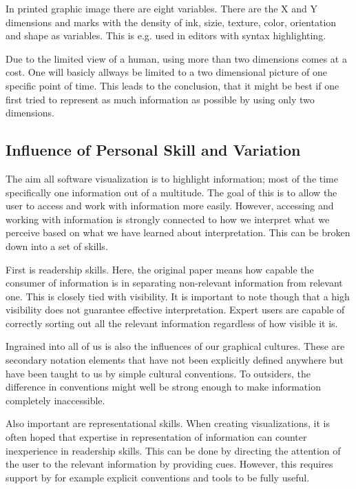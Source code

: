 \documentclass[11pt, a4paper, ngerman, twoside]{article}
\theoremstyle{plain}\newtheorem{Lemma}{Lemma}
\theoremstyle{plain}\newtheorem{Satz}[Lemma]{Satz}
\theoremstyle{definition}\newtheorem{Definition}[Lemma]{Definition}
\theoremstyle{definition}\newtheorem*{Beispiel}{Beispiel}
\theoremstyle{remark}\newtheorem*{Bemerkung}{Bemerkung}
\begin{document}
In printed graphic image there are eight variables\cite{bertin}. There are the X and Y dimensions and marks with the density of ink, sizie, texture, color, orientation and shape as variables. This is e.g. used in editors with syntax highlighting.

Due to the limited view of a human, using more than two dimensions comes at a cost. One will basicly allways be limited to a two dimensional picture of one specific point of time. This leads to the conclusion, that it might be best if one first tried to represent as much information as possible by using only two dimensions.

\subsection{Influence of Personal Skill and Variation}

The aim all software visualization is to highlight information; most of the time specifically one information out of a multitude. The goal of this is to allow the user to access and work with information more easily. However, accessing and working with information is strongly connected to how we interpret what we perceive based on what we have learned about interpretation. This can be broken down into a set of skills.

First is readership skills. Here, the original paper means how capable the consumer of information is in separating non-relevant information from relevant one. This is closely tied with visibility. It is important to note though that a high visibility does not guarantee effective interpretation. Expert users are capable of correctly sorting out all the relevant information regardless of how visible it is.

Ingrained into all of us is also the influences of our graphical cultures. These are secondary notation elements that have not been explicitly defined anywhere but have been taught to us by simple cultural conventions. To outsiders, the difference in conventions might well be strong enough to make information completely inaccessible.

Also important are representational skills. When creating visualizations, it is often hoped that expertise in representation of information can counter inexperience in readership skills. This can be done by directing the attention of the user to the relevant information by providing cues. However, this requires support by for example explicit conventions and tools to be fully useful.
\end{document}
